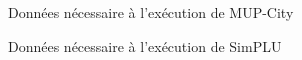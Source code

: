 \documentclass[xcolor=table]{beamer}
\begin{document}
\begin{frame}{Données nécessaire à l'exécution de MUP-City}
\end{frame}
\begin{frame}{Données nécessaire à l'exécution de SimPLU}
\end{frame}
\end{document}
